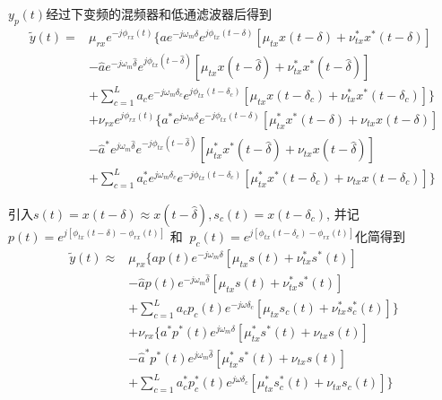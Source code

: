 \begin{frame}
	\begin{block}{$y_p(t)$经过下变频的混频器和低通滤波器后得到}
		\begin{equation*}
			\begin{split}
			\tilde{y}(t) = &\mu_{rx}e^{-j\phi_{rx}(t)} \Big\{  ae^{-j\omega_m\delta}e^{j\phi_{tx}(t-\delta)}[\mu_{tx}x(t-\delta)+\nu_{tx}^{*}x^{*}(t-\delta)] \\
			&- \hat{a} e^{-j\omega_m\hat\delta}e^{j\phi_{tx}(t-\hat\delta)}[\mu_{tx}x(t-\hat\delta)+\nu_{tx}^{*}x^{*}(t-\hat\delta)] \\
			& + \sum_{c=1}^{L}a_ce^{-j\omega_m\delta_c}e^{j\phi_{tx}(t-\delta_c)}[\mu_{tx}x(t-\delta_c)+\nu_{tx}^{*}x^{*}(t-\delta_c)] \Big\}  \\
			&+ \nu_{rx}e^{j\phi_{rx}(t)} \Big\{  a^{*}e^{j\omega_m\delta}e^{-j\phi_{tx}(t-\delta)}[\mu_{tx}^{*}x^{*}(t-\delta)+\nu_{tx}x(t-\delta)] \\
			&- \hat{a}^{*} e^{j\omega_m\hat\delta}e^{-j\phi_{tx}(t-\hat\delta)}[\mu_{tx}^{*}x^{*}(t-\hat\delta)+\nu_{tx}x(t-\hat\delta)] \\
			& + \sum_{c=1}^{L}a_c^{*}e^{j\omega_m\delta_c}e^{-j\phi_{tx}(t-\delta_c)}[\mu_{tx}^{*}x^{*}(t-\delta_c)+\nu_{tx}x(t-\delta_c)]  \Big\}
			\end{split}
		\end{equation*}
	\end{block}
\end{frame}  

\begin{frame}
	\begin{block}{引入$s(t)=x(t-\delta) \approx x(t-\hat\delta),s_c(t)=x(t-\delta_c)$,
			并记$p(t) = e^{j[\phi_{tx}(t-\delta)-\phi_{rx}(t)]} $ 和 $\ p_c(t) = e^{j[\phi_{tx}(t-\delta_c)-\phi_{rx}(t)]}$化简得到}
		\begin{equation*}
		\begin{split}
		\tilde{y}(t)  \approx &\mu_{rx} \Big\{  ap(t)e^{-j\omega_m\delta}[\mu_{tx}s(t)+\nu^{*}_{tx}s^*(t)] \\
		&- \hat{a}p(t)e^{-j\omega_m\hat\delta}[\mu_{tx}s(t)+\nu^{*}_{tx}s^*(t)]  \\
		&+ \sum_{c=1}^{L}a_cp_c(t)e^{-j\omega\delta_c}[\mu_{tx}s_c(t)+\nu^{*}_{tx}s_c^*(t)] \Big\}  \\
		&+ \nu_{rx} \Big\{  a^*p^*(t)e^{j\omega_m\delta}[\mu_{tx}^*s^*(t)+\nu_{tx}s(t)] \\
		&- \hat{a}^*p^*(t)e^{j\omega_m\hat\delta}[\mu_{tx}^*s^*(t)+\nu_{tx}s(t)]  \\
		&+ \sum_{c=1}^{L}a_c^*p^*_c(t)e^{j\omega\delta_c}[\mu_{tx}^*s_c^*(t)+\nu_{tx}s_c(t)] \Big\}
		\end{split}
		\end{equation*}
	\end{block}
\end{frame}

